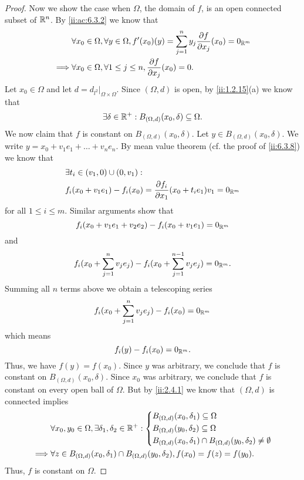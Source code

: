 \begin{proof}
  Now we show the case when \(\Omega\), the domain of \(f\), is an open connected subset of \(\mathbb{R}^n\).
  By \cref{ii:ac:6.3.2} we know that
  \begin{align*}
             & \forall x_0 \in \Omega, \forall y \in \Omega, f'(x_0)(y) = \sum_{j = 1}^n y_j \dfrac{\partial f}{\partial x_j}(x_0) = 0_{\mathbb{R}^m} \\
    \implies & \forall x_0 \in \Omega, \forall 1 \leq j \leq n, \dfrac{\partial f}{\partial x_j}(x_0) = 0.
  \end{align*}
  Let \(x_0 \in \Omega\) and let \(d = d_{l^2}|_{\Omega \times \Omega}\).
  Since \((\Omega, d)\) is open, by \cref{ii:1.2.15}(a) we know that
  \[
    \exists \delta \in \mathbb{R}^+ : B_{(\Omega, d)}(x_0, \delta) \subseteq \Omega.
  \]
  We now claim that \(f\) is constant on \(B_{(\Omega, d)}(x_0, \delta)\).
  Let \(y \in B_{(\Omega, d)}(x_0, \delta)\).
  We write \(y = x_0 + v_1 e_1 + \dots + v_n e_n\).
  By mean value theorem (cf. the proof of \cref{ii:6.3.8}) we know that
  \begin{align*}
     & \exists t_i \in (v_1, 0) \cup (0, v_1) :                                                         \\
     & f_i(x_0 + v_1 e_1) - f_i(x_0) = \dfrac{\partial f_i}{\partial x_1}(x_0 + t_i e_1) v_1 = 0_{\mathbb{R}^m}
  \end{align*}
  for all \(1 \leq i \leq m\).
  Similar arguments show that
  \[
    f_i(x_0 + v_1 e_1 + v_2 e_2) - f_i(x_0 + v_1 e_1) = 0_{\mathbb{R}^m}
  \]
  and
  \[
    f_i(x_0 + \sum_{j = 1}^n v_j e_j) - f_i(x_0 + \sum_{j = 1}^{n - 1} v_j e_j) = 0_{\mathbb{R}^m}.
  \]
  Summing all \(n\) terms above we obtain a telescoping series
  \[
    f_i(x_0 + \sum_{j = 1}^n v_j e_j) - f_i(x_0) = 0_{\mathbb{R}^m}
  \]
  which means
  \[
    f_i(y) - f_i(x_0) = 0_{\mathbb{R}^m}.
  \]
  Thus, we have \(f(y) = f(x_0)\).
  Since \(y\) was arbitrary, we conclude that \(f\) is constant on \(B_{(\Omega, d)}(x_0, \delta)\).
  Since \(x_0\) was arbitrary, we conclude that \(f\) is constant on every open ball of \(\Omega\).
  But by \cref{ii:2.4.1} we know that \((\Omega, d)\) is connected implies
  \begin{align*}
             & \forall x_0, y_0 \in \Omega, \exists \delta_1, \delta_2 \in \mathbb{R}^+ : \begin{dcases}
                                                                                    B_{(\Omega, d)}(x_0, \delta_1) \subseteq \Omega \\
                                                                                    B_{(\Omega, d)}(y_0, \delta_2) \subseteq \Omega \\
                                                                                    B_{(\Omega, d)}(x_0, \delta_1) \cap B_{(\Omega, d)}(y_0, \delta_2) \neq \emptyset
                                                                                  \end{dcases} \\
    \implies & \forall z \in B_{(\Omega, d)}(x_0, \delta_1) \cap B_{(\Omega, d)}(y_0, \delta_2), f(x_0) = f(z) = f(y_0).
  \end{align*}
  Thus, \(f\) is constant on \(\Omega\).
\end{proof}
